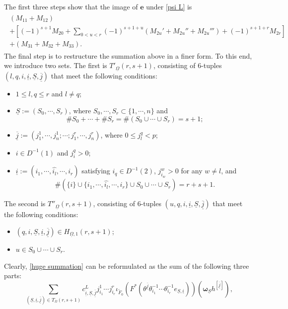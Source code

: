 \documentclass[12pt, a4paper]{article}
\begin{document}
The first three steps show that the image of $\boldsymbol{e}$ under \eqref{psi L} is
\begin{eqnarray}\label{huge summation}
\begin{array}{c}
 (M_{11}+M_{12})\\
 +[(-1)^{s+1}M_{20}+\sum_{0<u<r}(-1)^{s+1+u}(M_{2u}'+M_{2u}''+M_{2u}''')+(-1)^{s+1+r}M_{2r}]\\
 +(M_{31}+M_{32}+M_{33}).
 \end{array}
\end{eqnarray}
The final step is to restructure the summation above in a finer form. To this end, we introduce two sets. The first is $T'_{\underline\Omega}(r,s+1)$, consisting of $6$-tuples $(l,q,i,\underline i,\underline S,\overline{\underline j})$ that meet the following conditions:
\begin{itemize}

\item $1\leq l,q\leq r$ and $l\neq q$;

    \item $\underline S:=(S_0,\cdots,S_r)$, where $S_0,\cdots,S_r\subset\{1,\cdots,n\}$ and 
    $$\#S_0+\cdots+\#S_r=\#(S_0\cup\cdots\cup S_r)=s+1;$$
    
    \item $\underline{\overline j}:=(j^1_1,\cdots,j^1_n;\cdots;j^r_1,\cdots,j^r_n)$, where $0\leq j^q_l<p$;
    
 \item $i\in D^{-1}(1)$ and $j^q_i>0$;
 
    \item $\underline i:=(i_1,\cdots,\widehat{i_l},\cdots,i_r)$ satisfying $i_q\in D^{-1}(2)$, $j^w_{i_w}>0$ for any $w\neq l$, and 
    $$
   \#(\{i\}\cup\{i_1,\cdots,\widehat{i_l},\cdots,i_r\}\cup S_0\cup\cdots\cup S_r)=r+s+1.
    $$
\end{itemize}
The second is $T''_{\underline\Omega}(r,s+1)$, consisting of $6$-tuples $(u,q,i,\underline i,\underline S,\overline{\underline j})$ that meet the following conditions:
\begin{itemize}
    \item $(q,i,\underline S,\underline i,\overline{\underline j})\in H_{\underline\Omega,1}(r,s+1)$;
    \item $u\in S_0\cup\cdots\cup S_r$.
\end{itemize}
Clearly, \eqref{huge summation} can be reformulated as the sum of the following three parts:
$$
\sum_{(\underline S,\underline i,\underline{\overline j})\in T_{\Omega}(r,s+1)}c^L_{\underline i,\underline S,\underline{\overline j}}j^1_{i_1}\cdots j^r_{i_r}\iota_{\tilde F_0}(F^*(\theta^{\underline{\overline j}}\theta_{i_1}^{-1}\cdots\theta_{i_r}^{-1}e_{\underline S,\underline i}))(\boldsymbol{\omega}_{\underline S}h^{[\underline{\overline j}]}),
$$
\end{document}
